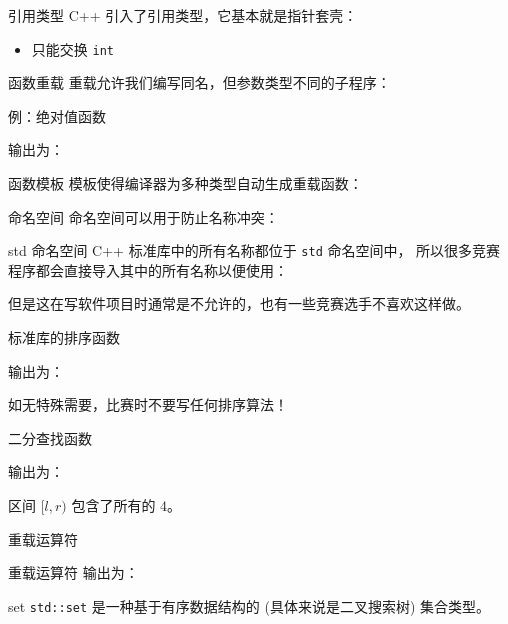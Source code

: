\documentclass[10pt,mathserif]{beamer}
\newcommand{\lstcode}[1] {  }
\newcommand{\lstterm}[1] {  }
\begin{document}
\begin{frame}{引用类型}
	C++ 引入了引用类型，它基本就是指针套壳：
	\lstcode{xchg2.cc}
	\pause
	\begin{itemize}
		\item 只能交换 \lstinline{int}
	\end{itemize}
\end{frame}

\begin{frame}{函数重载}
	重载允许我们编写同名，但参数类型不同的子程序：
	\lstcode{xchg3.cc}
\end{frame}

\begin{frame}{例：绝对值函数}
	\lstcode{abs.cc}
	输出为：
	\lstterm{abs.out}
\end{frame}

\begin{frame}{函数模板}
	模板使得编译器为多种类型自动生成重载函数：
	\lstcode{xchg4.cc}
\end{frame}

\begin{frame}{命名空间}
	命名空间可以用于防止名称冲突：
	\lstcode{namespace.cc}
\end{frame}

\begin{frame}{std 命名空间}
	C++ 标准库中的所有名称都位于 \lstinline{std} 命名空间中，
	所以很多竞赛程序都会直接导入其中的所有名称以便使用：
	\lstcode{using-std.cc}
	但是这在写软件项目时通常是不允许的，也有一些竞赛选手不喜欢这样做。
\end{frame}

\begin{frame}{标准库的排序函数}
	\lstcode{sort.cc}
	输出为：
	\lstterm{sort.out}
	如无特殊需要，比赛时不要写任何排序算法！
\end{frame}

\begin{frame}{二分查找函数}
	\lstcode{bsrch.cc}
	输出为：
	\lstterm{bsrch.out}
	区间 $[l, r)$ 包含了所有的 $4$。
\end{frame}

\begin{frame}{重载运算符}
	\lstcode{sort-vec.cc}
\end{frame}

\begin{frame}{重载运算符}
	输出为：
	\lstterm{sort-vec.out}
\end{frame}

\begin{frame}{set}
	\lstinline{std::set} 是一种基于有序数据结构的 (具体来说是二叉搜索树)
	集合类型。
	\lstcode{set.cc}
	\lstterm{set.out}
\end{frame}
\end{document}
